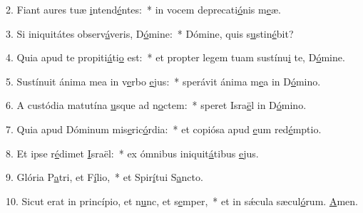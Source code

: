 2. Fiant aures tuæ \uline{i}ntend\uline{é}ntes:~* in vocem deprecati\uline{ó}nis m\uline{e}æ.\par 
3. Si iniquitátes observ\uline{á}veris, D\uline{ó}mine:~* Dómine, quis s\uline{u}stin\uline{é}bit?\par 
4. Quia apud te propiti\uline{á}ti\uline{o} est:~* et propter legem tuam sustínu\uline{i} te, D\uline{ó}mine.\par 
5. Sustínuit ánima mea in v\uline{e}rbo \uline{e}jus:~* sperávit ánima m\uline{e}a in D\uline{ó}mino.\par 
6. A custódia matutína \uline{u}sque ad n\uline{o}ctem:~* speret Isra\uline{ë}l in D\uline{ó}mino.\par 
7. Quia apud Dóminum mis\uline{e}ric\uline{ó}rdia:~* et copiósa apud \uline{e}um red\uline{é}mptio.\par 
8. Et ipse r\uline{é}dimet \uline{I}sraël:~* ex ómnibus iniquit\uline{á}tibus \uline{e}jus.\par 
9. Glória P\uline{a}tri, et F\uline{í}lio,~* et Spir\uline{í}tui S\uline{a}ncto.\par 
10. Sicut erat in princípio, et n\uline{u}nc, et s\uline{e}mper,~* et in sǽcula sæcul\uline{ó}rum. \uline{A}men.\par 

